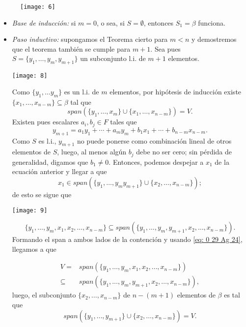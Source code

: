 \begin{figure}[H]
\centering\captionsetup{format = hang}
	\begin{measuredfigure}
		\texttt{[image: 6]} 
 	\end{measuredfigure}
 \end{figure}
\begin{itemize}
\item \textit{Base de inducción:} si $m = 0$, o sea, si $S = \emptyset$,
entonces $S_{1} = \beta$ funciona.
\item \textit{Paso inductivo:} supongamos el Teorema cierto para 
$m < n$ y demostremos que el teorema también se cumple para
$m+1$. Sea pues $S = \{ y_{1}, \ldots , y_{m}, y_{m+1} \}$
un subconjunto l.i. de $m+1$ elementos. 
\begin{marginfigure}
\texttt{[image: 8]} 
\end{marginfigure}
Como $\{ y_{1}, \ldots y_{m} \}$ es un l.i. de $m$ elementos, por
hipótesis de inducción existe 
$\{ x_{1}, \ldots , x_{n-m} \} \subseteq \beta$ tal que 
\begin{equation}
	\label{eq: 0 29 Ag 24}
	 span(\{ y_{1}, \ldots , x_{m} \} \cup
	 \{ x_{1}, \ldots , x_{n-m} \}) = V.
\end{equation}
Existen pues escalares $a_{i}, b_{j} \in F$
tales que
\[
y_{m+1} = a_{1}y_{1} + \cdots + a_{m}y_{m} + 
b_{1}x_{1} + \cdots + b_{n-m}x_{n-m}.
\] 
Como $S$ es l.i., $y_{m+1}$ no puede ponerse como combinación
lineal de otros elementos de $S$, luego, al menos
algún $b_{j}$ debe no ser cero; sin pérdida de generalidad,
digamos que $b_{1} \neq 0$. Entonces, podemos despejar a 
$x_{1}$ de la ecuación anterior y llegar a que 
\[
x_{1} \in span(\{ y_{1}, \ldots , y_{m} y_{m+1} \} \cup
\{ x_{2}, \ldots , x_{n-m} \});
\]
de esto se sigue que 
\begin{marginfigure}
\texttt{[image: 9]} 
\end{marginfigure}
\[
\{ y_{1}, \ldots , y_{m}, x_{1}, x_{2}, \ldots , x_{n-m} \}
\subseteq 
span(
\{
y_{1}, \ldots , y_{m}, y_{m+1}, x_{2}, \ldots, x_{n-m}
\}
)
.
\]
Formando el span a ambos lados de la contención y usando 
\eqref{eq: 0 29 Ag 24}, llegamos a que 

\begin{align*}
	V = & span(\{ y_{1}, \ldots , y_{m}, x_{1}, x_{2}, \ldots , x_{n-m} \}) \\
	\subseteq & 
	span(
	\{
	y_{1}, \ldots , y_{m}, y_{m+1}, x_{2}, \ldots, x_{n-m}
	\}
	),
\end{align*}
luego, 
el subconjunto $\{x_{2}, \ldots , x_{n-m} \}$ de
$n-(m+1)$ elementos de $\beta$ es tal que 
\[
span(
\{ y_{1}, \ldots , y_{m+1} \} \cup
\{ x_{2}, \ldots , x_{n-m} \}
)
 = V.
\]
\end{itemize}
\QEDB
\vspace{0.2cm}


